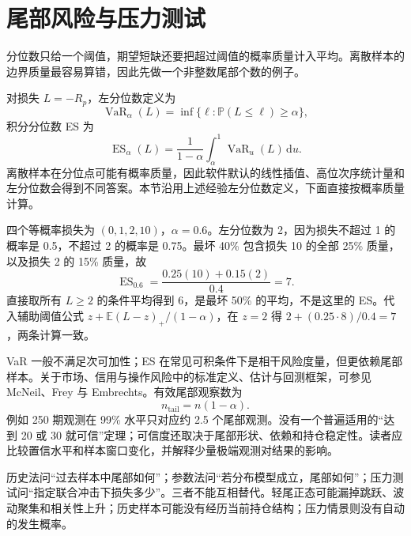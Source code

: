\section{尾部风险与压力测试}
\label{ch:lower-portfolio-tail}

\begin{itemize}
  
\end{itemize}

分位数只给一个阈值，期望短缺还要把超过阈值的概率质量计入平均。离散样本的边界质量最容易算错，因此先做一个非整数尾部个数的例子。



对损失 $L=-R_p$，左分位数定义为
\[
 \operatorname{VaR}_\alpha(L)=\inf\{\ell:\mathbb P(L\le\ell)\ge\alpha\},
\]
积分分位数 ES 为
\[
 \operatorname{ES}_\alpha(L)=\frac1{1-\alpha}
 \int_\alpha^1\operatorname{VaR}_u(L)\,\mathrm du.
\]
离散样本在分位点可能有概率质量，因此软件默认的线性插值、高位次序统计量和左分位数会得到不同答案。本节沿用上述经验左分位数定义，下面直接按概率质量计算。


四个等概率损失为 $(0,1,2,10)$，$\alpha=0.6$。左分位数为 2，因为损失不超过 1 的概率是 0.5，不超过 2 的概率是 0.75。最坏 40\% 包含损失 10 的全部 25\% 质量，以及损失 2 的 15\% 质量，故
\[
 \operatorname{ES}_{0.6}=\frac{0.25(10)+0.15(2)}{0.4}=7.
\]
直接取所有 $L\geq2$ 的条件平均得到 6，是最坏 50\% 的平均，不是这里的 ES。代入辅助阈值公式 $z+\mathbb E(L-z)_+/(1-\alpha)$，在 $z=2$ 得 $2+(0.25\cdot8)/0.4=7$，两条计算一致。



VaR 一般不满足次可加性；ES 在常见可积条件下是相干风险度量，但更依赖尾部样本。关于市场、信用与操作风险中的标准定义、估计与回测框架，可参见 McNeil、Frey 与 Embrechts\cite{mcneil2015quantitative}。有效尾部观察数为
\[
 n_{\mathrm{tail}}=n(1-\alpha).
\]
例如 250 期观测在 99\% 水平只对应约 2.5 个尾部观测。没有一个普遍适用的“达到 20 或 30 就可信”定理；可信度还取决于尾部形状、依赖和持仓稳定性。读者应比较置信水平和样本窗口变化，并解释少量极端观测对结果的影响。


历史法问“过去样本中尾部如何”；参数法问“若分布模型成立，尾部如何”；压力测试问“指定联合冲击下损失多少”。三者不能互相替代。轻尾正态可能漏掉跳跃、波动聚集和相关性上升；历史样本可能没有经历当前持仓结构；压力情景则没有自动的发生概率。

